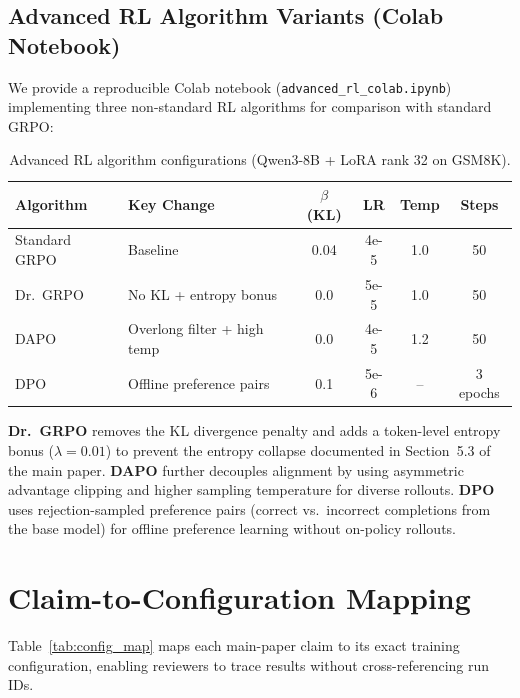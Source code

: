 \documentclass{article}
\begin{document}
\subsection{Advanced RL Algorithm Variants (Colab Notebook)}

We provide a reproducible Colab notebook (\texttt{advanced\_rl\_colab.ipynb}) implementing three non-standard RL algorithms for comparison with standard GRPO:

\begin{table}[htbp]
    \centering
    \caption{Advanced RL algorithm configurations (Qwen3-8B + LoRA rank 32 on GSM8K).}
    \begin{tabular}{llcccc}
        \toprule
        Algorithm & Key Change & $\beta$ (KL) & LR & Temp & Steps \\
        \midrule
        Standard GRPO & Baseline & 0.04 & 4e-5 & 1.0 & 50 \\
        Dr.\ GRPO & No KL + entropy bonus & 0.0 & 5e-5 & 1.0 & 50 \\
        DAPO & Overlong filter + high temp & 0.0 & 4e-5 & 1.2 & 50 \\
        DPO & Offline preference pairs & 0.1 & 5e-6 & -- & 3 epochs \\
        \bottomrule
    \end{tabular}
    \label{tab:advanced_rl}
\end{table}

\noindent\textbf{Dr.\ GRPO} \citep{deepseekr1} removes the KL divergence penalty and adds a token-level entropy bonus ($\lambda=0.01$) to prevent the entropy collapse documented in Section~5.3 of the main paper. \textbf{DAPO} \citep{yu2025dapo} further decouples alignment by using asymmetric advantage clipping and higher sampling temperature for diverse rollouts. \textbf{DPO} \citep{rafailov2024dpo} uses rejection-sampled preference pairs (correct vs.\ incorrect completions from the base model) for offline preference learning without on-policy rollouts.

\section{Claim-to-Configuration Mapping}

Table~\ref{tab:config_map} maps each main-paper claim to its exact training configuration, enabling reviewers to trace results without cross-referencing run IDs.
\end{document}
